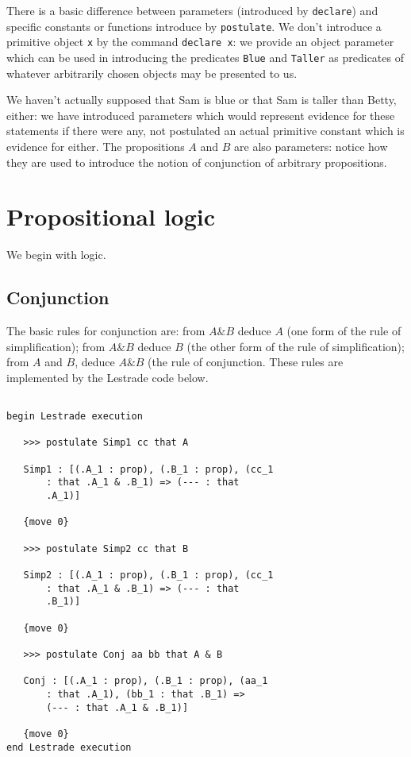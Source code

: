 \documentclass[12pt]{article}
\begin{document}
There is a basic difference between parameters (introduced by {\tt declare}) and specific constants or functions introduce by {\tt postulate}.  We don't introduce a primitive object {\tt x} by the command {\tt declare x}:  we provide an object parameter which can be used in introducing the predicates {\tt Blue} and {\tt Taller} as predicates of whatever arbitrarily chosen objects may be presented to us.

We haven't actually supposed that Sam is blue or that Sam is taller than Betty, either:  we have introduced parameters which would represent evidence for these statements if there were any, not postulated an actual primitive constant which is evidence for either.  The propositions $A$ and $B$ are also parameters:  notice how they are used to introduce the notion of conjunction of arbitrary propositions.

\section{Propositional logic}

We begin with logic.



\subsection{Conjunction}





The basic rules for conjunction are:  from $A \& B$ deduce $A$ (one form of the rule of simplification);
from $A \& B$ deduce $B$ (the other form of the rule of simplification); from $A$ and $B$, deduce $A \& B$ (the rule of conjunction.  These rules are implemented by the Lestrade code below.

\begin{verbatim}

begin Lestrade execution

   >>> postulate Simp1 cc that A

   Simp1 : [(.A_1 : prop), (.B_1 : prop), (cc_1 
       : that .A_1 & .B_1) => (--- : that 
       .A_1)]

   {move 0}

   >>> postulate Simp2 cc that B

   Simp2 : [(.A_1 : prop), (.B_1 : prop), (cc_1 
       : that .A_1 & .B_1) => (--- : that 
       .B_1)]

   {move 0}

   >>> postulate Conj aa bb that A & B

   Conj : [(.A_1 : prop), (.B_1 : prop), (aa_1 
       : that .A_1), (bb_1 : that .B_1) => 
       (--- : that .A_1 & .B_1)]

   {move 0}
end Lestrade execution

\end{verbatim}
\end{document}
